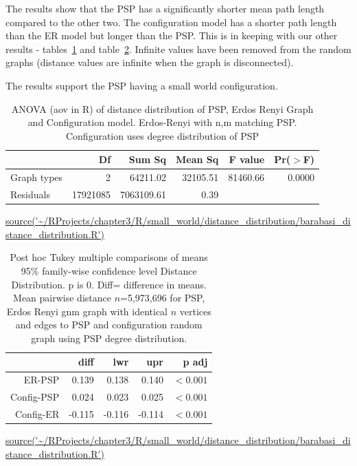 The results show that the PSP has  a significantly shorter mean path length  compared to the other two. The configuration model has a shorter path length than the ER model but longer than the PSP. This is in keeping with our other results - tables~\ref{tab:ANOVA_distance_distribution} and table~\ref{tab:Tukey post hoc}. Infinite values have been removed from the random graphs (distance values are infinite when the graph is disconnected).

The results support the PSP having a small world configuration. 

\begin{table}[ht]
\centering
\begin{tabular}{lrrrrr}
  \toprule
 & Df & Sum Sq & Mean Sq & F value & Pr($>$F) \\ 
  \midrule
Graph types & 2 & 64211.02 & 32105.51 & 81460.66 & 0.0000 \vspace{1mm}\\ 
  Residuals & 17921085 & 7063109.61 & 0.39 &  &  \vspace{1mm}\\ 
   \bottomrule
\end{tabular}
\caption{ANOVA (aov in R) of distance distribution of PSP, Erdos Renyi Graph and Configuration model. Erdos-Renyi with n,m matching PSP. Configuration uses degree distribution of PSP}
\tiny\url{source('~/RProjects/chapter3/R/small_world/distance_distribution/barabasi_distance_distribution.R')}
\label{tab:ANOVA_distance_distribution}
\end{table}
\begin{table}[ht]
\centering
\begin{tabular}{rrrrr}
  \toprule  
 & diff & lwr & upr & p adj \\ 
  \midrule
ER-PSP & 0.139 & 0.138 & 0.140 & $<0.001$ \\ 
  Config-PSP & 0.024 & 0.023 & 0.025 & $<0.001$ \\ 
  Config-ER & -0.115 & -0.116 & -0.114 & $<0.001$ \\ 
   \bottomrule
\end{tabular}
\caption[Tukey Distance Distribution]{Post hoc  Tukey multiple comparisons of means
    95\% family-wise confidence level Distance Distribution. p is 0. Diff= difference in means. Mean pairwise distance $n$=5,973,696 for PSP, Erdos Renyi gnm graph with identical $n$ vertices and edges to PSP and configuration random graph using PSP degree distribution. }
\tiny\url{source('~/RProjects/chapter3/R/small_world/distance_distribution/barabasi_distance_distribution.R')}
\label{tab:Tukey post hoc}
\end{table}



